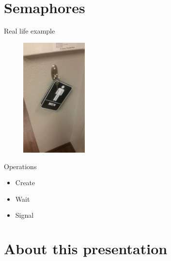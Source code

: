 \documentclass[10pt, compress, aspectratio=169]{beamer}
\begin{document}
\section{Semaphores}
\begin{frame}{Real life example}
   \begin{figure}[ht]
    \centering
    \includegraphics[width=0.3\textwidth, keepaspectratio=true]{images/semaphore.jpg}
  \end{figure}
\end{frame}

\begin{frame}{Operations}
  \begin{itemize}
    \item Create
    \item Wait
    \item Signal
  \end{itemize}
\end{frame}

\section{About this presentation}
\begin{frame}[standout]
   \begin{center}\ccbysa\end{center}
\end{frame}


\maketitle
\end{document}
